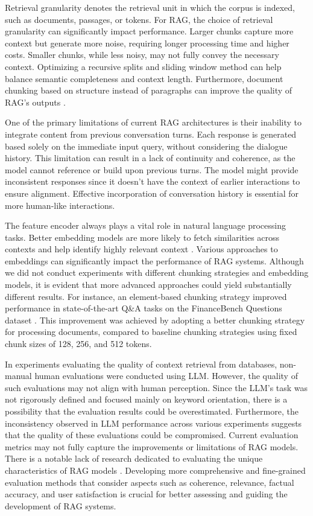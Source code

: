 Retrieval granularity denotes the retrieval unit in which the corpus is indexed, such as documents, passages, or tokens. For RAG, the choice of retrieval granularity can significantly impact performance. Larger chunks capture more context but generate more noise, requiring longer processing time and higher costs. Smaller chunks, while less noisy, may not fully convey the necessary context. Optimizing a recursive splits and sliding window method can help balance semantic completeness and context length. Furthermore, document chunking based on structure instead of paragraphs can improve the quality of RAG's outputs \cite{Yepes.5Feb2024}.

One of the primary limitations of current RAG architectures is their inability to integrate content from previous conversation turns. Each response is generated based solely on the immediate input query, without considering the dialogue history. This limitation can result in a lack of continuity and coherence, as the model cannot reference or build upon previous turns. The model might provide inconsistent responses since it doesn't have the context of earlier interactions to ensure alignment. Effective incorporation of conversation history is essential for more human-like interactions.

The feature encoder always plays a vital role in natural language processing tasks. Better embedding models are more likely to fetch similarities across contexts and help identify highly relevant context \cite{Dong.28May2024}. Various approaches to embeddings can significantly impact the performance of RAG systems. Although we did not conduct experiments with different chunking strategies and embedding models, it is evident that more advanced approaches could yield substantially different results. For instance, an element-based chunking strategy improved performance in state-of-the-art Q\&A tasks on the FinanceBench Questions dataset \cite{Yepes.5Feb2024}. This improvement was achieved by adopting a better chunking strategy for processing documents, compared to baseline chunking strategies using fixed chunk sizes of 128, 256, and 512 tokens. 

In experiments evaluating the quality of context retrieval from databases, non-manual human evaluations were conducted using LLM. However, the quality of such evaluations may not align with human perception. Since the LLM's task was not rigorously defined and focused mainly on keyword orientation, there is a possibility that the evaluation results could be overestimated. Furthermore, the inconsistency observed in LLM performance across various experiments suggests that the quality of these evaluations could be compromised. Current evaluation metrics may not fully capture the improvements or limitations of RAG models. There is a notable lack of research dedicated to evaluating the unique characteristics of RAG models \cite{Gao.18Dec2023}. Developing more comprehensive and fine-grained evaluation methods that consider aspects such as coherence, relevance, factual accuracy, and user satisfaction is crucial for better assessing and guiding the development of RAG systems.